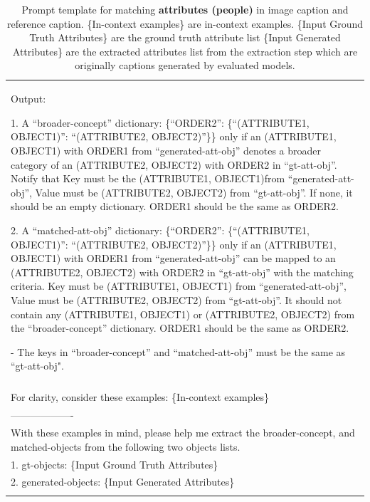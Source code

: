 \begin{table}[h!]
\begin{minipage}{0.95\textwidth}
\begin{tcolorbox}
\begin{tabular}{p{}}
        Output:
        
        1. A ``broader-concept'' dictionary: \{``ORDER2'': \{``(ATTRIBUTE1, OBJECT1)'': ``(ATTRIBUTE2, OBJECT2)''\}\} only if an (ATTRIBUTE1, OBJECT1) with ORDER1 from ``generated-att-obj'' denotes a broader category of an (ATTRIBUTE2, OBJECT2) with ORDER2 in ``gt-att-obj''. Notify that Key must be the (ATTRIBUTE1, OBJECT1)from ``generated-att-obj'', Value must be (ATTRIBUTE2, OBJECT2) from ``gt-att-obj''. If none, it should be an empty dictionary. ORDER1 should be the same as ORDER2.
        
        2. A ``matched-att-obj'' dictionary: \{``ORDER2'': \{``(ATTRIBUTE1, OBJECT1)'': ``(ATTRIBUTE2, OBJECT2)''\}\} only if an (ATTRIBUTE1, OBJECT1) with ORDER1 from ``generated-att-obj'' can be mapped to an (ATTRIBUTE2, OBJECT2) with ORDER2 in ``gt-att-obj'' with the matching criteria. Key must be (ATTRIBUTE1, OBJECT1) from ``generated-att-obj'', Value must be (ATTRIBUTE2, OBJECT2) from ``gt-att-obj''. It should not contain any (ATTRIBUTE1, OBJECT1) or (ATTRIBUTE2, OBJECT2) from the ``broader-concept'' dictionary. ORDER1 should be the same as ORDER2.
        
        - The keys in ``broader-concept'' and ``matched-att-obj'' must be the same as ``gt-att-obj". \\\\
        
        For clarity, consider these examples: \textcolor[rgb]{0,0.7,0}{ \{In-context examples\} } \\
------------------- \\
        With these examples in mind, please help me extract the broader-concept, and matched-objects from the following two objects lists. \\ 
        1. gt-objects: \textcolor[rgb]{0.8,0,0}{\{Input Ground Truth Attributes\}}  \\
        2. generated-objects: \textcolor[rgb]{0.8,0,0}{\{Input Generated Attributes\}} \\
\\

    \end{tabular}
\end{tcolorbox}
\caption{Prompt template for matching \textbf{attributes (people)} in image caption and reference caption.
\textcolor[rgb]{0,0.7,0}{ \{In-context examples\} } are in-context examples. \textcolor[rgb]{0.8,0,0}{\{Input Ground Truth Attributes\}} are the ground truth attribute list
\textcolor[rgb]{0.8,0,0}{\{Input Generated Attributes\}} are the extracted attributes list from the extraction step which are originally captions generated by evaluated models.}
    \label{tab:matching_att_people}
\end{minipage}
\end{table}

